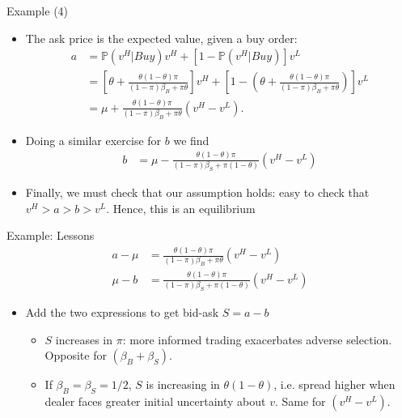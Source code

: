 \documentclass[english,10pt
,aspectratio=169
]{beamer}
\begin{document}
\begin{frame}{Example (4)}
\begin{itemize}
	\item The ask price is the expected value, given a buy order:
	\begin{align*}
		a 
		& = \mathbb{P}(v^H| Buy) v^H + [1-\mathbb{P}(v^H| Buy)] v^L \\
		& = \left[ \theta + \frac{\theta(1-\theta) \pi}{(1-\pi)\beta_B+\pi\theta} \right] v^H + \left[ 1 - \left( \theta + \frac{\theta(1-\theta) \pi}{(1-\pi)\beta_B+\pi\theta} \right) \right] v^L\\
		& = \mu + \frac{\theta(1-\theta) \pi}{(1-\pi)\beta_B+\pi\theta} (v^H -v^L).
	\end{align*}
	\item Doing a similar exercise for $b$ we find
	\begin{align*}
		b 		&= \mu - \frac{\theta(1-\theta) \pi}{(1-\pi)\beta_S+\pi(1-\theta)}(v^H-v^L)
	\end{align*}
	\item Finally, we must check that our assumption holds: easy to check that $v^H > a > b > v^L$. Hence, \alert{this is an equilibrium}
\end{itemize}
\end{frame}


\begin{frame}{Example: Lessons}
	\begin{align*}
	a - \mu 		&= \frac{\theta(1-\theta) \pi}{(1-\pi)\beta_B+\pi\theta}(v^H-v^L) \\
	\mu - b 		&= \frac{\theta(1-\theta) \pi}{(1-\pi)\beta_S+\pi(1-\theta)}(v^H-v^L)
	\end{align*}
	\begin{itemize}
		\item Add the two expressions to get bid-ask  $S = a-b$
		\begin{itemize}
			\item $S$ \alert{increases in $\pi$}: more informed trading exacerbates adverse selection. Opposite for $(\beta_B+\beta_S)$.
			\item If $\beta_B=\beta_S=1/2$, $S$ is \alert{increasing in $\theta(1-\theta)$}, i.e. spread higher when dealer faces greater initial uncertainty about $v$. Same for $(v^H-v^L)$.
		\end{itemize}
	\end{itemize}
\end{frame}
\end{document}
